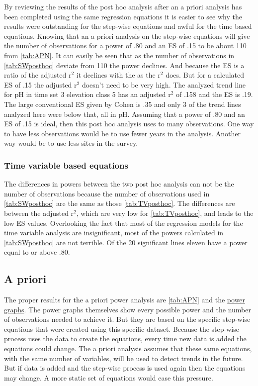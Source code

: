 By reviewing the results of the post hoc analysis after an a priori analysis has been completed using the same regression equations it is easier to see why the results were outstanding for the step-wise equations and awful for the time based equations.
Knowing that an a priori analysis on the step-wise equations will give the number of observations for a power of .80 and an ES of .15 to be about 110 from \autoref{tab:APN}.
It can easily be seen that as the number of observations in \autoref{tab:SWposthoc} deviate from 110 the power declines.
And because the ES is a ratio of the adjusted r$^2$ it declines with the as the r$^2$ does.
But for a calculated ES of .15 the adjusted r$^2$ doesn't need to be very high.
The analyzed trend line for pH in time set 3 elevation class 5 has an adjusted r$^2$ of .158 and the ES is .19.
The large conventional ES given by Cohen is .35 and only 3 of the trend lines analyzed here were below that, all in pH.
Assuming that a power of .80 and an ES of .15 is ideal, then this post hoc analysis uses to many observations.
One way to have less observations would be to use fewer years in the analysis.
Another way would be to use less sites in the survey.

\subsubsection{Time variable based equations}

The differences in powers between the two post hoc analysis can not be the number of observations because the number of observations used in \autoref{tab:SWposthoc} are the same as those \autoref{tab:TVposthoc}.
The differences are between the adjusted r$^2$, which are very low for \autoref{tab:TVposthoc}, and leads to the low ES values.
Overlooking the fact that most of the regression models for the time variable analysis are insignificant, most of the powers calculated in \autoref{tab:SWposthoc} are not terrible.
Of the 20 significant lines eleven have a power equal to or above .80.

\subsection{A priori}%

The proper results for the a priori power analysis are \autoref{tab:APN} and the \hyperref[ch:APA]{power graphs}.
The power graphs themselves show every possible power and the number of observations needed to achieve it.
But they are based on the specific step-wise equations that were created using this specific dataset.
Because the step-wise process uses the data to create the equations, every time new data is added the equations could change.
The a priori analysis assumes that these same equations, with the same number of variables, will be used to detect trends in the future.
But if data is added and the step-wise process is used again then the equations may change.
A more static set of equations would ease this pressure.

